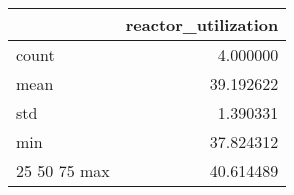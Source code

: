 \begin{tabular}{lr}
\toprule
 & reactor\_utilization \\
\midrule
count & 4.000000 \\
mean & 39.192622 \\
std & 1.390331 \\
min & 37.824312 \\
25%
50%
75%
max & 40.614489 \\
\bottomrule
\end{tabular}

